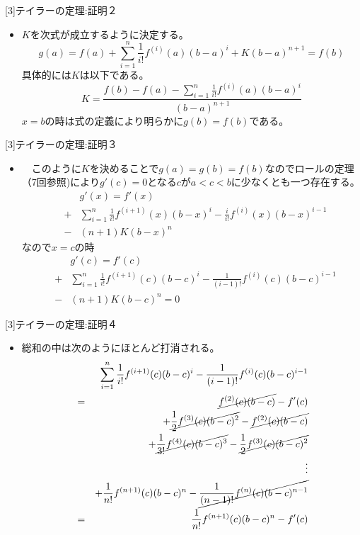 \begin{slide}{[3]テイラーの定理:証明２}
\begin{itemize}
\item $K$を次式が成立するように決定する。
\begin{equation}
g(a) = f(a) + \sum_{i=1}^n \frac{1}{i!}f^{(i)}(a) (b-a)^i  + K(b-a)^{n+1} = f(b) \nonumber 
\end{equation}
具体的には$K$は以下である。
\begin{equation}
K = \frac{f(b) - f(a) - \sum_{i=1}^n \frac{1}{i!}f^{(i)}(a)(b-a)^i }{(b-a)^{n+1}} \label{eq:taylortheorem}
\end{equation}
$x=b$の時は式の定義により明らかに$g(b) = f(b)$である。
\end{itemize}
\end{slide}
\begin{slide}{[3]テイラーの定理:証明３}
\begin{itemize}
\item　このように$K$を決めることで$g(a)=g(b)=f(b)$なのでロールの定理（7回参照)により$g'(c)=0$となる$c$が$a<c<b$に少なくとも一つ存在する。
\begin{eqnarray}
&& g'(x) = f'(x) \nonumber  \\
&+& \sum_{i=1}^n \frac{1}{i!}f^{(i+1)}(x)(b-x)^i - \frac{i}{i!}f^{(i)}(x)(b-x)^{i-1} \nonumber \\
&-& (n+1)K(b-x)^{n} \nonumber
\end{eqnarray}
なので$x=c$の時
\begin{eqnarray}
&& g'(c) = f'(c) \nonumber \\
 &+& \sum_{i=1}^n \frac{1}{i!}f^{(i+1)}(c)(b-c)^i - \frac{1}{(i-1)!}f^{(i)}(c)(b-c)^{i-1} \nonumber \\
 &-& (n+1)K(b-c)^{n} = 0 \nonumber
\end{eqnarray}
\end{itemize}
\end{slide}
\begin{slide}{[3]テイラーの定理:証明４}
\begin{itemize}
\item 総和の中は次のようにほとんど打消される。
\begin{eqnarray}
&&\sum_{i=1}^n \frac{1}{i!}f^{(i+1)}(c)(b-c)^i - \frac{1}{(i-1)!}f^{(i)}(c)(b-c)^{i-1} \nonumber \\
&=& \cancel{f^{(2)}(c)(b-c)} - f'(c) \nonumber \\
&& + \cancel{\frac{1}{2}f^{(3)}(c)(b-c)^2}  - \cancel{f^{(2)}(c)(b-c)} \nonumber \\
&& + \cancel{\frac{1}{3!}f^{(4)}(c)(b-c)^3} - \cancel{\frac{1}{2}f^{(3)}(c)(b-c)^2} \nonumber \\
&& \vdots \nonumber \\
&& + \frac{1}{n!}f^{(n+1)}(c)(b-c)^n- \cancel{\frac{1}{(n-1)!}f^{(n)}(c)(b-c)^{n-1}} \nonumber \\
&=&  \frac{1}{n!}f^{(n+1)}(c)(b-c)^n - f'(c) \label{eq:taylorsum}
\end{eqnarray}
\end{itemize}
\end{slide}
